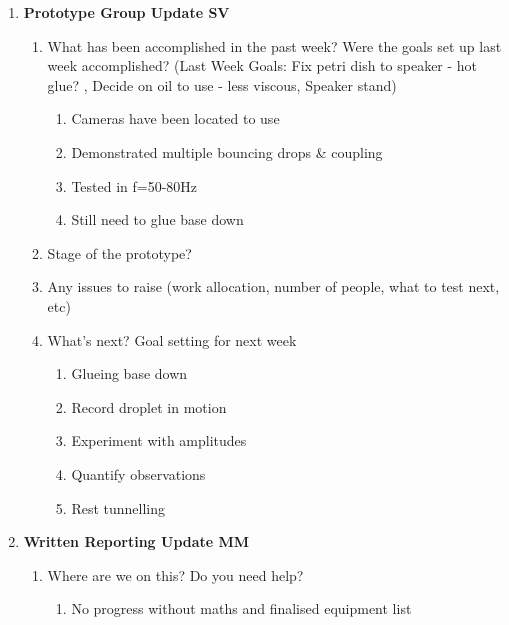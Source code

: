 \begin{enumerate}
\item  \textbf{Prototype Group Update SV}

\begin{enumerate}
\item \textbf{ }What has been accomplished in the past week? Were the goals set up last week accomplished? (Last Week Goals: Fix petri dish to speaker - hot glue? , Decide on oil to use - less viscous, Speaker stand)

\begin{enumerate}
\item  Cameras have been located to use

\item  Demonstrated multiple bouncing drops \& coupling

\item  Tested in f=50-80Hz

\item  Still need to glue base down
\end{enumerate}

\item  Stage of the prototype?

\item  Any issues to raise (work allocation, number of people, what to test next, etc)

\item  What's next? Goal setting for next week

\begin{enumerate}
\item  Glueing base down

\item  Record droplet in motion

\item  Experiment with amplitudes

\item  Quantify observations

\item  Rest tunnelling\\
\end{enumerate}
\end{enumerate}

\item  \textbf{Written Reporting Update MM}

\begin{enumerate}
\item \textbf{ }Where are we on this? Do you need help?

\begin{enumerate}
\item  No progress without maths and finalised equipment list
\end{enumerate}


\end{enumerate}
\end{enumerate}
